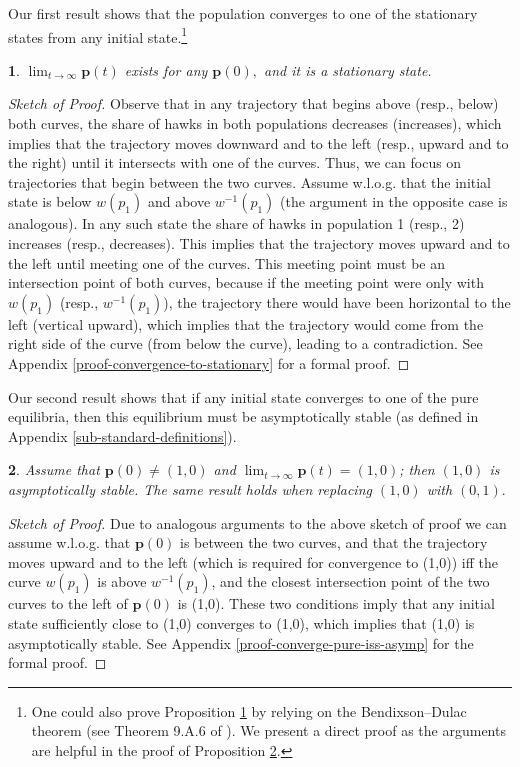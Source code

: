 \documentclass[12pt]{article}
\numberwithin{equation}{section}
\numberwithin{figure}{section}
\theoremstyle{definition}
\theoremstyle{plain}
\theoremstyle{plain}
\newtheorem{prop}{\protect\propositionname}
\theoremstyle{plain}
\theoremstyle{remark}
\theoremstyle{plain}
\theoremstyle{plain}
\providecommand{\propositionname}{Proposition}
\begin{document}
Our first result shows that the population converges to one of the stationary states from any initial state.\footnote{
One could also prove Proposition \ref{pro-convergence-to-stationary} by relying on the Bendixson--Dulac theorem (see Theorem 9.A.6 of \citealp{sandholm2010population}). We present a direct proof as the arguments are helpful in the proof of Proposition \ref{pro-convergence-to-pure-iff-asymp}.}
\begin{prop}\label{pro-convergence-to-stationary}
  $\lim_{t\rightarrow\infty}\mathbf{p}\left(t\right)$ exists for any $\textbf{p}(0),$ and it is a stationary state.
\end{prop}
\begin{proof}[Sketch of Proof]
Observe that in any trajectory that begins above (resp., below) both curves, the share of hawks in both populations decreases (increases), which implies that the trajectory moves downward and to the left (resp., upward and to the right) until it intersects with one of the curves. Thus, we can focus on trajectories that begin between the two curves. Assume w.l.o.g. that the initial state is below 
 $w(p_1)$ and above  $w^{-1}(p_1)$ (the argument in the opposite case is analogous). In any such state the share of hawks in population 1 (resp., 2) increases (resp., decreases). This implies that the trajectory moves upward and to the left until meeting one of the curves. This meeting point must be an intersection point of both curves, because if the meeting point were only with $w(p_1)$ (resp., $w^{-1}(p_1)$), the trajectory there would have been  horizontal to the left (vertical upward), which implies that the trajectory would come from the right side of the curve (from below the curve), leading to a contradiction.  See Appendix \ref{proof-convergence-to-stationary} for a formal proof.
\end{proof}
Our second result shows that if any initial state converges to one of the pure equilibria, then this equilibrium must be asymptotically stable (as defined in Appendix \ref{sub-standard-definitions}).
\begin{prop}\label{pro-convergence-to-pure-iff-asymp}
Assume that  $\textbf{p}(0)\neq (1,0)$ and $\lim_{t\rightarrow\infty}\mathbf{p}\left(t\right)=(1,0)$; then $(1,0)$ is asymptotically stable. The same result holds when replacing $(1,0)$ with $(0,1).$
\end{prop}
\begin{proof}[Sketch of Proof]
Due to analogous arguments to the above sketch of proof we can assume w.l.o.g. that $\textbf{p}(0)$ is between the two curves, and that the trajectory moves upward and to the left (which is required for convergence to (1,0)) iff the curve $w(p_1)$ is above $w^{-1}(p_1)$, and the closest intersection point of the two curves to the left of  $\textbf{p}(0)$ is (1,0). These two conditions imply that any initial state sufficiently close to (1,0) converges to (1,0), which implies that (1,0) is asymptotically stable.
See Appendix \ref{proof-converge-pure-iss-asymp} for the formal proof.
\end{proof}
\end{document}
